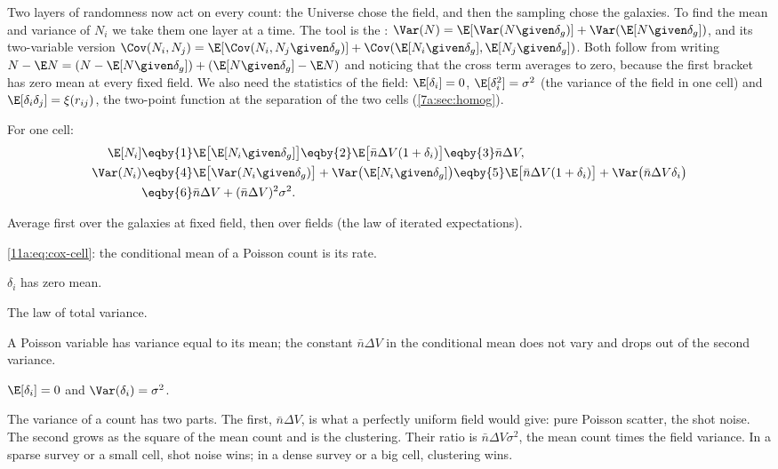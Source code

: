 Two layers of randomness now act on every count: the Universe chose the field,
and then the sampling chose the galaxies. To find the mean and variance of $N_i$
we take them one layer at a time. The tool is the 
:
$\Var(N)=\E[\Var(N\given\delta_g)]+\Var(\E[N\given\delta_g])$, and its
two-variable version $\Cov(N_i,N_j)=\E[\Cov(N_i,N_j\given\delta_g)]
+\Cov(\E[N_i\given\delta_g],\E[N_j\given\delta_g])$. Both follow from writing
$N-\E N=(N-\E[N\given\delta_g])+(\E[N\given\delta_g]-\E N)$ and noticing that the
cross term averages to zero, because the first bracket has zero mean at every
fixed field. We also need the statistics of the field: $\E[\delta_i]=0$,
$\E[\delta_i^2]=\sigma^2$ (the variance of the field in one cell) and
$\E[\delta_i\delta_j]=\xi(r_{ij})$, the two-point function at the separation of
the two cells (\cref{7a:sec:homog}).

For one cell:
\begin{align}
  \E[N_i]
  &\eqby{1} \E\bigl[\E[N_i\given\delta_g]\bigr]
   \eqby{2} \E\bigl[\bar n\Delta V(1+\delta_i)\bigr]
   \eqby{3} \bar n\Delta V, \label{11a:eq:mean-count}\\
  \Var(N_i)
  &\eqby{4} \E\bigl[\Var(N_i\given\delta_g)\bigr]+\Var\bigl(\E[N_i\given\delta_g]\bigr)
   \eqby{5} \E\bigl[\bar n\Delta V(1+\delta_i)\bigr]+\Var\bigl(\bar n\Delta V\delta_i\bigr)
   \nonumber\\
  &\eqby{6} \bar n\Delta V+(\bar n\Delta V)^2\sigma^2 . \label{11a:eq:var-count}
\end{align}
\begin{explain}
  \item Average first over the galaxies at fixed field, then over fields (the law
        of iterated expectations).
  \item \eqref{11a:eq:cox-cell}: the conditional mean of a Poisson count is its
        rate.
  \item $\delta_i$ has zero mean.
  \item The law of total variance.
  \item A Poisson variable has variance equal to its mean; the constant
        $\bar n\Delta V$ in the conditional mean does not vary and drops out of the
        second variance.
  \item $\E[\delta_i]=0$ and $\Var(\delta_i)=\sigma^2$.
\end{explain}
The variance of a count has two parts. The first, $\bar n\Delta V$, is what a
perfectly uniform field would give: pure Poisson scatter, the shot noise. The
second grows as the square of the mean count and is the clustering. Their ratio
is $\bar n\Delta V\sigma^2$, the mean count times the field variance. In a sparse
survey or a small cell, shot noise wins; in a dense survey or a big cell,
clustering wins.

